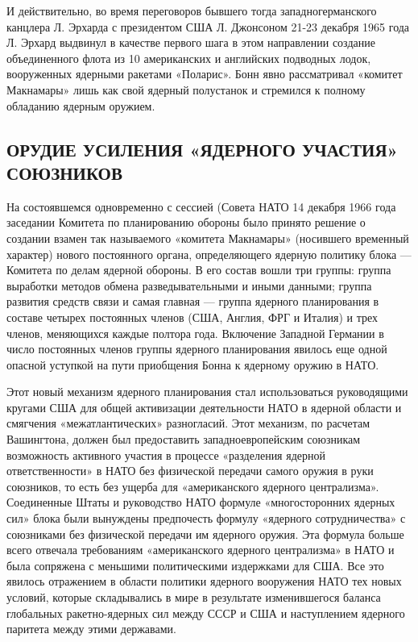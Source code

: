 \documentclass[12pt, a4paper, openany]{book}
\begin{document}
	И действительно, во время переговоров бывшего тогда западногерманского канцлера Л. Эрхарда с президентом США Л. Джонсоном 21-23 декабря 1965 года Л. Эрхард выдвинул в качестве первого шага в этом направлении создание объединенного флота из 10 американских и английских подводных лодок, вооруженных ядерными ракетами «Поларис». Бонн явно рассматривал «комитет Макнамары» лишь как свой ядерный полустанок и стремился к полному обладанию ядерным оружием.
	
	\subsection[Орудие усиления «ядерного участия» союзников]{\center ОРУДИЕ УСИЛЕНИЯ «ЯДЕРНОГО УЧАСТИЯ» СОЮЗНИКОВ}	
	
	На состоявшемся одновременно с сессией (Совета НАТО 14 декабря 1966 года заседании Комитета по планированию обороны было принято решение о создании взамен так называемого «комитета Макнамары» (носившего временный характер) нового постоянного органа, определяющего ядерную политику блока — Комитета по делам ядерной обороны. В его состав вошли три группы: группа выработки методов обмена разведывательными и иными данными; группа развития средств связи и самая главная — группа ядерного планирования в составе четырех постоянных членов (США, Англия, ФРГ и Италия) и трех членов, меняющихся каждые полтора года. Включение Западной Германии в число постоянных членов группы ядерного планирования явилось еще одной опасной уступкой на пути приобщения Бонна к ядерному оружию в НАТО.
	
	Этот новый механизм ядерного планирования стал использоваться руководящими кругами США для общей активизации деятельности НАТО в ядерной области и смягчения «межатлантических» разногласий. Этот механизм, по расчетам Вашингтона, должен был предоставить западноевропейским союзникам возможность активного участия в процессе «разделения ядерной ответственности» в НАТО без физической передачи самого оружия в руки союзников, то есть без ущерба для «американского ядерного централизма». Соединенные Штаты и руководство НАТО формуле «многосторонних ядерных сил» блока были вынуждены предпочесть формулу «ядерного сотрудничества» с союзниками без физической передачи им ядерного оружия. Эта формула больше всего отвечала требованиям «американского ядерного централизма» в НАТО и была сопряжена с меньшими политическими издержками для США. Все это явилось отражением в области политики ядерного вооружения НАТО тех новых условий, которые складывались в мире в результате изменившегося баланса глобальных ракетно-ядерных сил между СССР и США и наступлением ядерного паритета между этими державами.
	
\end{document}
